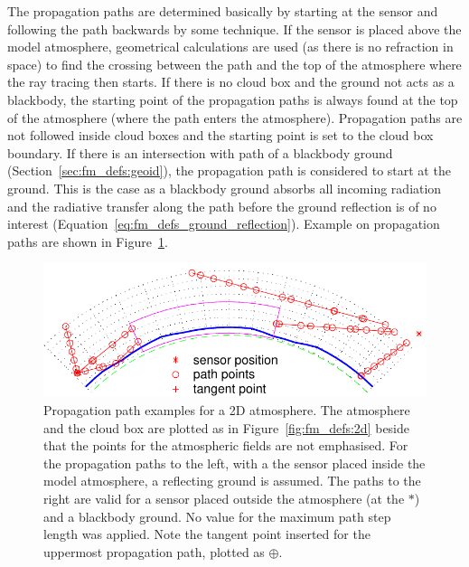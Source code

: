 The propagation paths are determined basically by starting at the
sensor and following the path backwards by some 
technique. If the sensor is placed above the model atmosphere,
geometrical calculations are used (as there is no refraction in space)
to find the crossing between the path and the top of the atmosphere
where the ray tracing then starts. If there is no cloud box and the
ground not acts as a blackbody, the starting point of the propagation
paths is always found at the top of the atmosphere (where the path
enters the atmosphere). Propagation paths are not followed inside
cloud boxes and the starting point is set to the cloud box boundary.
If there is an intersection with path of a blackbody ground
(Section~\ref{sec:fm_defs:geoid}), the propagation path is considered
to start at the ground. This is the case as a blackbody ground absorbs
all incoming radiation and the radiative transfer along the path
before the ground reflection is of no interest
(Equation~\ref{eq:fm_defs_ground_reflection}). Example on propagation
paths are shown in Figure~\ref{fig:fm_defs:ppath_cases1}.

\begin{figure}[!t]
 \begin{center}
  \includegraphics*[width=0.95\hsize]{Figs/fm_definitions/ppath_cases1}
  \caption{Propagation path examples for a 2D atmosphere. The atmosphere 
    and the cloud box are plotted as in Figure~\ref{fig:fm_defs:2d}
    beside that the points for the atmospheric fields are not
    emphasised. For the propagation paths to the left, with a the
    sensor placed inside the model atmosphere, a reflecting ground is
    assumed. The paths to the right are valid for a sensor placed
    outside the atmosphere (at the $*$) and a blackbody ground. No
    value for the maximum path step length was applied. Note the tangent
    point inserted for the uppermost propagation path, plotted as $\oplus$.}
  \label{fig:fm_defs:ppath_cases1}
 \end{center}
\end{figure}
 

